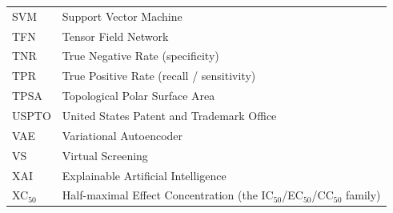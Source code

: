 \documentclass[11pt, oneside]{book}
\begin{document}
\begin{longtable}{@{}p{}p{}@{}}
SVM & Support Vector Machine \\
TFN & Tensor Field Network \\
TNR & True Negative Rate (specificity) \\
TPR & True Positive Rate (recall / sensitivity) \\
TPSA & Topological Polar Surface Area \\
USPTO & United States Patent and Trademark Office \\
VAE & Variational Autoencoder \\
VS & Virtual Screening \\
XAI & Explainable Artificial Intelligence \\
XC$_{50}$ & Half-maximal Effect Concentration (the IC$_{50}$/EC$_{50}$/CC$_{50}$ family) \\
\end{longtable}
\end{document}
